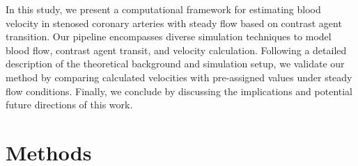 \documentclass[times,twocolumn,final]{elsarticle}
\begin{document}
In this study, we present a computational framework for estimating blood velocity in stenosed coronary arteries with steady flow based on contrast agent transition. Our pipeline encompasses diverse simulation techniques to model blood flow, contrast agent transit, and velocity calculation. Following a detailed description of the theoretical background and simulation setup, we validate our method by comparing calculated velocities with pre-assigned values under steady flow conditions. Finally, we conclude by discussing the implications and potential future directions of this work.

\section{Methods}

\end{document}

